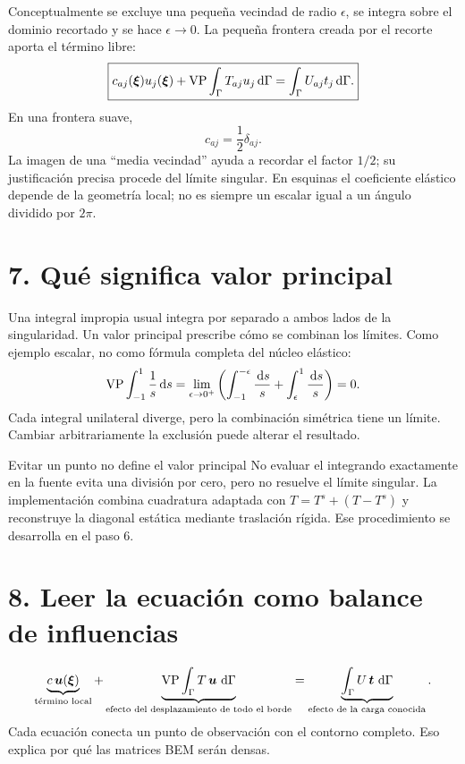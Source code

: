 \documentclass[11pt]{article}
\begin{document}
Conceptualmente se excluye una pequeña vecindad de radio \(\epsilon\),
se integra sobre el dominio recortado y se hace \(\epsilon\to0\).
La pequeña frontera creada por el recorte aporta el término libre:
\[
 \boxed{
 c_{aj}(\bm{\xi})u_j(\bm{\xi})+
 \operatorname{VP}\int_\Gamma T_{aj}u_j\,\mathrm{d}\Gamma
 =\int_\Gamma U_{aj}t_j\,\mathrm{d}\Gamma.}
\]
En una frontera suave,
\[
 c_{aj}=\frac12\delta_{aj}.
\]
La imagen de una ``media vecindad'' ayuda a recordar el factor \(1/2\);
su justificación precisa procede del límite singular. En esquinas el
coeficiente elástico depende de la geometría local; no es siempre
un escalar igual a un ángulo dividido por \(2\pi\).

\section*{7. Qué significa valor principal}
Una integral impropia usual integra por separado a ambos lados de la
singularidad. Un valor principal prescribe cómo se combinan los límites.
Como ejemplo escalar, no como fórmula completa del núcleo elástico:
\[
 \operatorname{VP}\int_{-1}^{1}\frac{1}{s}\,\mathrm{d} s
 =\lim_{\epsilon\to0^+}
 \left(\int_{-1}^{-\epsilon}\frac{\,\mathrm{d} s}{s}
       +\int_{\epsilon}^{1}\frac{\,\mathrm{d} s}{s}\right)=0.
\]
Cada integral unilateral diverge, pero la combinación simétrica tiene un
límite. Cambiar arbitrariamente la exclusión puede alterar el resultado.

\begin{alerta}{Evitar un punto no define el valor principal}
No evaluar el integrando exactamente en la fuente evita una división por
cero, pero no resuelve el límite singular. La implementación combina
cuadratura adaptada con \(T=T^s+(T-T^s)\) y reconstruye la diagonal
estática mediante traslación rígida. Ese procedimiento se desarrolla
en el paso 6.
\end{alerta}

\newpage
\section*{8. Leer la ecuación como balance de influencias}
\[
 \underbrace{c\,\bm{u}(\bm{\xi})}_{\text{término local}}
 +\underbrace{\operatorname{VP}\int_\Gamma T\,\bm{u}\,\,\mathrm{d}\Gamma}_{\text{efecto del desplazamiento de todo el borde}}
 =\underbrace{\int_\Gamma U\,\bm{t}\,\,\mathrm{d}\Gamma}_{\text{efecto de la carga conocida}}.
\]
Cada ecuación conecta un punto de observación con el contorno completo.
Eso explica por qué las matrices BEM serán densas.
\end{document}
